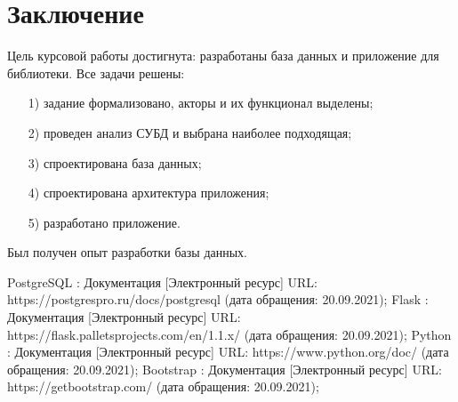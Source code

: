 \section*{Заключение}
Цель курсовой работы достигнута: разработаны база данных и приложение для библиотеки. Все задачи решены:
\begin{itemize}
	\item[1)] задание формализовано, акторы и их функционал выделены;
	\item[2)] проведен анализ СУБД и выбрана наиболее подходящая;
	\item[3)] спроектирована база данных;
	\item[4)] спроектирована архитектура приложения;
	\item[5)] разработано приложение.
\end{itemize}

Был получен опыт разработки базы данных.

\clearpage
\begin{thebibliography}{9}
	 PostgreSQL : Документация [Электронный ресурс] URL: https://postgrespro.ru/docs/postgresql (дата обращения: 20.09.2021);
	\bibitem{} Flask : Документация [Электронный ресурс] URL: https://flask.palletsprojects.com/en/1.1.x/ (дата обращения: 20.09.2021);
	\bibitem{} Python : Документация [Электронный ресурс] URL: https://www.python.org/doc/ (дата обращения: 20.09.2021);
	\bibitem{} Bootstrap : Документация [Электронный ресурс] URL: https://getbootstrap.com/ (дата обращения: 20.09.2021);
\end{thebibliography}


